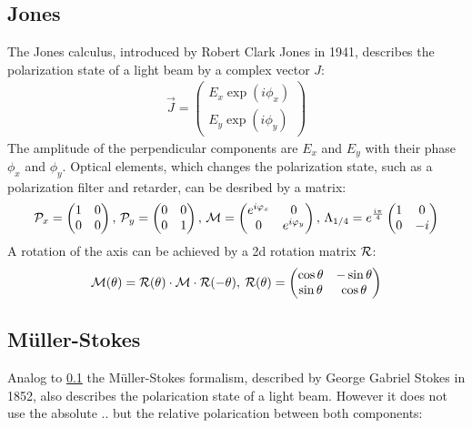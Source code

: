 \subsection{Jones}
\label{sec:jones}
% 
The Jones calculus, introduced by Robert Clark Jones in 1941, describes the polarization state of a light beam by a complex vector $J$:
% 
\begin{align}
    \vec{J} = \begin{pmatrix} E_x \exp(i \phi_x) \\ E_y \exp(i \phi_y) \end{pmatrix}
\end{align}
% 
The amplitude of the perpendicular components are $E_x$ and $E_y$ with their phase $\phi_x$ and $\phi_y$.
Optical elements, which changes the polarization state, such as a polarization filter and retarder, can be desribed by a matrix:
% 
\begin{align}
\begin{split}
\mathcal{P}_x = 
\begin{pmatrix}
1 & 0 \\ 0 & 0
\end{pmatrix}
, \,
\mathcal{P}_y = 
\begin{pmatrix}
0 & 0 \\ 0 & 1
\end{pmatrix}
, \,
\mathcal{M} =
\begin{pmatrix}
e^{i \varphi_x} & 0 \\ 0 & e^{i \varphi_y}
\end{pmatrix}
, \,
\Lambda_{1/4}=
e^{\frac{i \pi}{4}}
\begin{pmatrix}
1 & 0 \\ 0 & -i
\end{pmatrix}
\end{split}
\end{align}
% 
A rotation of the axis can be achieved by a 2d rotation matrix $\mathcal{R}$:
% 
\begin{align}
\begin{split}
\mathcal{M}(\theta )=\mathcal{R}(\theta )\cdot\mathcal{M}\cdot\mathcal{R}(-\theta )
, \>
\mathcal{R}(\theta ) = 
\begin{pmatrix}
\cos \theta & -\sin \theta \\
\sin \theta & \cos \theta
\end{pmatrix}
\end{split}
\end{align}
% 
% 
% 
\subsection{M\"uller-Stokes}\label{sec:Mueller-Stokes}
\label{sec:mueller_stokes}
% 
Analog to \cref{sec:jones} the M\"uller-Stokes formalism, described by George Gabriel Stokes in 1852, also describes the polarication state of a light beam.
However it does not use the absolute .. but the relative polarication between both components:
% 
